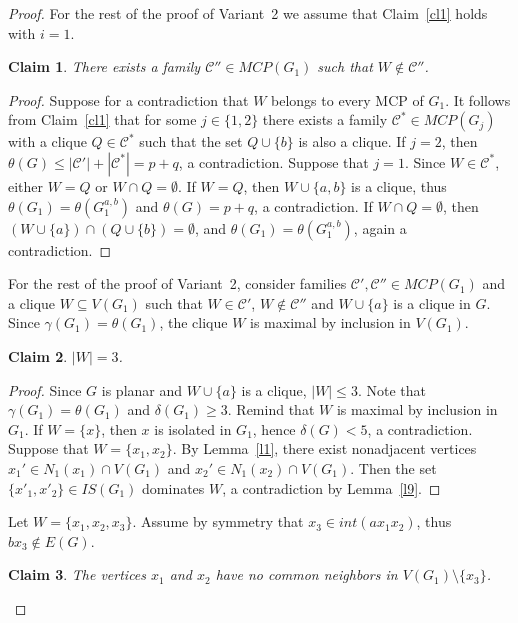 \documentclass[12pt]{article}
\newtheorem{claim}{Claim}
\begin{document}
\begin{proof}
For the rest of the proof of Variant~2 we assume that Claim~\ref{cl1} holds with $i = 1$.

\begin{claim}\label{cl2}
There exists a family $\mathcal{C}'' \in MCP(G_1)$ such that $W \notin \mathcal{C}''$.
\end{claim}

\begin{proof}
Suppose for a contradiction that $W$ belongs to every MCP of $G_1$. It follows from Claim~\ref{cl1}  that for some $j \in \{1,2\}$ there exists a family $\mathcal{C}^* \in MCP(G_j)$ with a clique $Q \in \mathcal{C}^*$ such that the set $Q \cup \{b\}$ is also a clique. If $j = 2$, then  $\theta(G) \leq |\mathcal{C}'| + |\mathcal{C}^*| = p + q$, a contradiction. Suppose that $j = 1$. Since $W \in \mathcal{C}^*$, either $W = Q$ or $W \cap Q = \emptyset$. If $W = Q$, then $W \cup \{a,b\}$ is a clique, thus $\theta(G_1) = \theta(G^{a,b}_1)$ and $\theta(G) = p + q$, a contradiction. If $W \cap Q = \emptyset$, then $(W \cup \{a\}) \cap (Q \cup \{b\}) = \emptyset$, and $\theta(G_1) = \theta(G^{a,b}_1)$, again a contradiction.
\end{proof}

For the rest of the proof of Variant~2, consider families $\mathcal{C}',\mathcal{C}'' \in MCP(G_1)$ and a clique $W \subseteq V(G_1)$ such that $W \in \mathcal{C}'$, $W \notin \mathcal{C}''$ and $W \cup \{a\}$ is a clique in $G$. Since $\gamma(G_1) = \theta(G_1)$, the clique $W$ is maximal by inclusion in $V(G_1)$.

\begin{claim}\label{cl3}
$|W| = 3$.
\end{claim}

\begin{proof}
Since $G$ is planar and $W \cup \{a\}$ is a clique, $|W| \leq 3$. Note that $\gamma(G_1) = \theta(G_1)$ and $\delta(G_1) \geq 3$. Remind that $W$ is maximal by inclusion in $G_1$. If $W = \{x\}$, then $x$ is isolated in $G_1$, hence $\delta(G) < 5$, a contradiction. Suppose that $W = \{x_1,x_2\}$.  By Lemma~\ref{l1}, there exist nonadjacent vertices $x_1' \in N_1(x_1) \cap V(G_1)$ and $x_2' \in N_1(x_2) \cap V(G_1)$. Then the set $\{x'_1,x'_2\} \in IS(G_1)$ dominates $W$, a contradiction by Lemma~\ref{l9}.
\end{proof}

Let $W = \{x_1,x_2,x_3\}$. Assume by symmetry that $x_3 \in int(ax_1x_2)$, thus $bx_3 \notin E(G)$.

\begin{claim}\label{cl4}
The vertices $x_1$ and $x_2$ have no common neighbors in $V(G_1) \setminus \{x_3\}$. 
\end{claim}


\end{proof}
\end{document}
